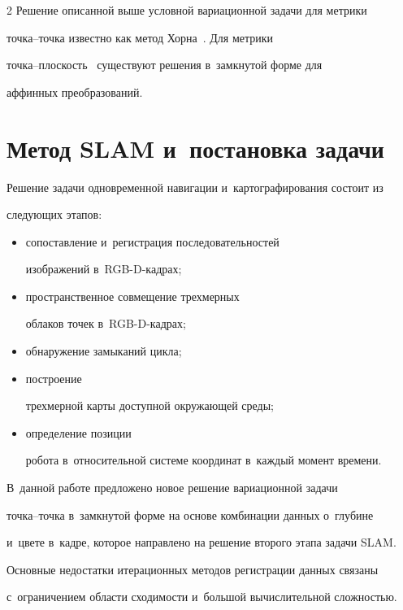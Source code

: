 \begin{multicols}{2}
Решение описанной выше условной вариационной задачи для метрики  

точ\-ка--точ\-ка известно как метод Хорна~\cite{8-voh}. Для мет\-ри\-ки  

точ\-ка--плос\-кость~\cite{14-voh} существуют решения в~замк\-ну\-той форме для 

аффинных преобразований. 

  

\section{Метод SLAM и~постановка задачи}



  Решение задачи одновременной навигации и~картографирования со\-сто\-ит из 

сле\-ду\-ющих этапов: 

\begin{itemize}

\item сопоставление и~регистрация последовательностей 

изображений в~RGB-D-кад\-рах; 

\item пространственное совмещение трехмерных 

облаков точек в~RGB-D-кад\-рах; 

\item обнаружение замыканий цикла; 

\item построение 

трехмерной карты доступной окружающей среды;

\item определение позиции 

робота в~относительной системе координат в~каждый момент времени. 

\end{itemize}



В~данной работе предложено новое решение вариационной задачи  

точ\-ка--точ\-ка в~замк\-ну\-той форме на основе комбинации данных о~глубине 

и~цвете в~кадре, которое на\-прав\-ле\-но на решение второго этапа задачи SLAM. 

Основные недостатки итерационных методов регистрации данных связаны 

с~ограничением области схо\-ди\-мости и~большой вы\-чис\-ли\-тель\-ной слож\-ностью. 


\end{multicols}
